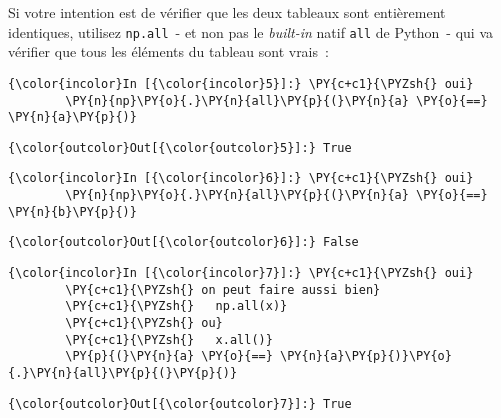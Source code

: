     Si votre intention est de vérifier que les deux tableaux sont
entièrement identiques, utilisez \texttt{np.all}~- et non pas le
\emph{built-in} natif \texttt{all} de Python~- qui va vérifier que tous
les éléments du tableau sont vrais~:

    \begin{Verbatim}[commandchars=\\\{\},frame=single,framerule=0.3mm,rulecolor=\color{cellframecolor}]
{\color{incolor}In [{\color{incolor}5}]:} \PY{c+c1}{\PYZsh{} oui}
        \PY{n}{np}\PY{o}{.}\PY{n}{all}\PY{p}{(}\PY{n}{a} \PY{o}{==} \PY{n}{a}\PY{p}{)}
\end{Verbatim}


\begin{Verbatim}[commandchars=\\\{\},frame=single,framerule=0.3mm,rulecolor=\color{cellframecolor}]
{\color{outcolor}Out[{\color{outcolor}5}]:} True
\end{Verbatim}
            
    \begin{Verbatim}[commandchars=\\\{\},frame=single,framerule=0.3mm,rulecolor=\color{cellframecolor}]
{\color{incolor}In [{\color{incolor}6}]:} \PY{c+c1}{\PYZsh{} oui}
        \PY{n}{np}\PY{o}{.}\PY{n}{all}\PY{p}{(}\PY{n}{a} \PY{o}{==} \PY{n}{b}\PY{p}{)}
\end{Verbatim}


\begin{Verbatim}[commandchars=\\\{\},frame=single,framerule=0.3mm,rulecolor=\color{cellframecolor}]
{\color{outcolor}Out[{\color{outcolor}6}]:} False
\end{Verbatim}
            
    \begin{Verbatim}[commandchars=\\\{\},frame=single,framerule=0.3mm,rulecolor=\color{cellframecolor}]
{\color{incolor}In [{\color{incolor}7}]:} \PY{c+c1}{\PYZsh{} oui}
        \PY{c+c1}{\PYZsh{} on peut faire aussi bien}
        \PY{c+c1}{\PYZsh{}   np.all(x)}
        \PY{c+c1}{\PYZsh{} ou}
        \PY{c+c1}{\PYZsh{}   x.all()}
        \PY{p}{(}\PY{n}{a} \PY{o}{==} \PY{n}{a}\PY{p}{)}\PY{o}{.}\PY{n}{all}\PY{p}{(}\PY{p}{)}
\end{Verbatim}


\begin{Verbatim}[commandchars=\\\{\},frame=single,framerule=0.3mm,rulecolor=\color{cellframecolor}]
{\color{outcolor}Out[{\color{outcolor}7}]:} True
\end{Verbatim}
            
